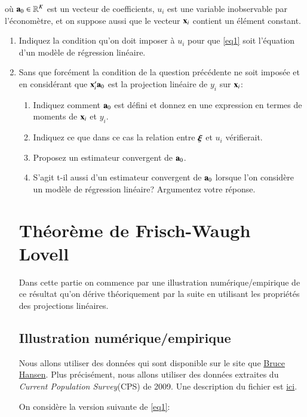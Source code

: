 où ${\mathbf a}_0\in \mathbb{R}^K$ est un vecteur de coefficients, $u_i$ est une variable inobservable par l'économètre, et on suppose aussi
que le vecteur ${\mathbf x}_i$ contient un élément constant.

\begin{enumerate}
\item Indiquez la condition qu'on doit imposer à $u_i$ pour que \eqref{eq1} soit l'équation d'un modèle de régression linéaire.
\item Sans que forcément la condition de la question précédente ne soit imposée et en considérant que ${\mathbf x}_i^\prime{\mathbf a}_0$
est la projection linéaire de $y_i$ sur ${\mathbf x}_i$:
\begin{enumerate}
  \item Indiquez comment ${\mathbf a}_0$ est défini et donnez en une expression en termes de moments de ${\mathbf x}_i$ et $y_i$.
  \item Indiquez ce que dans ce cas la relation entre ${\boldsymbol \xi}$ et $u_i$ vérifierait.
  \item Proposez un estimateur convergent de ${\mathbf a}_0$.
  \item S'agit t-il aussi d'un estimateur convergent de ${\mathbf a}_0$ lorsque l'on considère un modèle de régression linéaire? Argumentez votre réponse.
\end{enumerate}

\section{Théorème de Frisch-Waugh Lovell}

Dans cette partie on commence par une illustration numérique/empirique de ce résultat qu'on dérive théoriquement par la suite 
en utilisant les propriétés des projections linéaires.

\subsection{Illustration numérique/empirique}

Nous allons utiliser des données qui sont 
disponible sur le site que \href{https://www.ssc.wisc.edu/~bhansen/}{Bruce Hansen}. 
Plus précisément, nous allons utiliser des données extraites du \emph{Current Population Survey}(CPS) de 2009. 
Une description du fichier est \href{https://www.ssc.wisc.edu/~bhansen/econometrics/cps09mar_description.pdf}{ici}.

\medskip

On considère la version suivante de \eqref{eq1}:


\end{enumerate}
